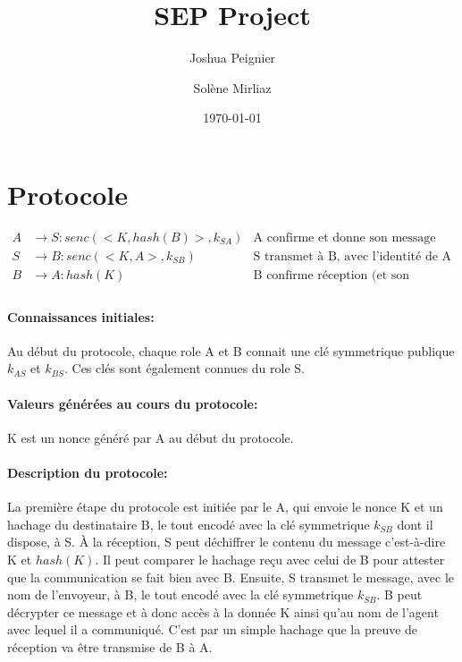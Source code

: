 \documentclass{article}
\title{SEP Project}
\author{Joshua Peignier \and Solène Mirliaz}
\date{\today}
\begin{document}
\maketitle

\section{Protocole}
\begin{align*}
    A & \rightarrow S : senc(<K, hash(B)>, k_{SA})
      & \text{A confirme et donne son message}\\
    S & \rightarrow B : senc(<K, A>, k_{SB})
      & \text{S transmet à B, avec l'identité de A}\\
    B & \rightarrow A : hash(K)
      & \text{B confirme réception (et son identité)}\\
\end{align*}

\paragraph{Connaissances initiales: } Au début du protocole, chaque role A et B connait une clé symmetrique publique $k_{AS}$ et $k_{BS}$. Ces clés sont également connues du role S.

\paragraph{Valeurs générées au cours du protocole: } K est un nonce généré par A au début du protocole.

\paragraph{Description du protocole: } La première étape du protocole est initiée par le A, qui envoie le nonce K et un hachage du destinataire B, le tout encodé avec la clé symmetrique $k_{SB}$ dont il dispose, à S.
%
À la réception, S peut déchiffrer le contenu du message c'est-à-dire K et $hash(K)$. Il peut comparer le hachage reçu avec celui de B pour attester que la communication se fait bien avec B.
%
Ensuite, S transmet le message, avec le nom de l'envoyeur, à B, le tout encodé avec la clé symmetrique $k_{SB}$.
%
B peut décrypter ce message et à donc accès à la donnée K ainsi qu'au nom de l'agent avec lequel il a communiqué.
%
C'est par un simple hachage que la preuve de réception va être transmise de B à A.
\end{document}
